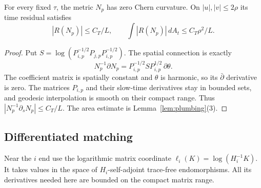 \begin{lemma}\label{lem:neck}
For every fixed $\tau$, the metric $N_p$ has zero Chern curvature.
On $|u|,|v|\le2\rho$ its time residual satisfies
\begin{equation}\label{eq:neck-residual}
 |R(N_p)|\le C_T/L,\qquad
 \int |R(N_p)|\,dA_t\le C_T\rho^2/L.
\end{equation}
\end{lemma}
\begin{proof}
Put $S=\log(P_{i,p}^{-1/2}P_{j,p}P_{i,p}^{-1/2})$. The spatial
connection is exactly
\[
 N_p^{-1}\partial N_p
 =P_{i,p}^{-1/2}SP_{i,p}^{1/2}\,\partial\theta.
\]
The coefficient matrix is spatially constant and $\theta$ is harmonic,
so its $\bar\partial$ derivative is zero. The matrices $P_{i,p}$ and
their slow-time derivatives stay in bounded sets, and geodesic
interpolation is smooth on their compact range. Thus
$|N_p^{-1}\partial_sN_p|\le C_T/L$. The area estimate is
Lemma~\ref{lem:plumbing}(3).
\end{proof}

\subsection{Differentiated matching}
Near the $i$ end use the logarithmic matrix coordinate
$\ell_i(K)=\log(H_i^{-1}K)$. It takes values in the space of
$H_i$-self-adjoint trace-free endomorphisms. All its derivatives
needed here are bounded on the compact matrix range.

